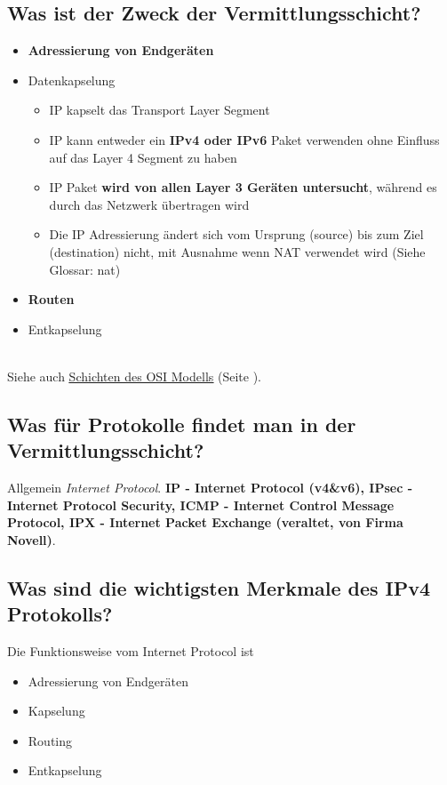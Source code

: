 \subsection*{Was ist der Zweck der Vermittlungsschicht?}
\begin{itemize}
    \item \textbf{Adressierung von Endgeräten }
    \item Datenkapselung
    \begin{itemize}
        \item IP kapselt das Transport Layer Segment
        \item IP kann entweder ein \textbf{IPv4 oder IPv6} Paket verwenden ohne Einfluss auf das Layer 4 Segment zu haben
        \item IP Paket \textbf{wird von allen Layer 3 Geräten untersucht}, während es durch das Netzwerk übertragen wird
        \item Die IP Adressierung ändert sich vom Ursprung (source) bis zum Ziel (destination) nicht, mit Ausnahme wenn NAT verwendet wird (Siehe Glossar: \gls{nat})
    \end{itemize}
    \item \textbf{Routen}
    \item Entkapselung
\end{itemize}\,\\
Siehe auch \underline{\hyperref[sub:SchichtenOSIModell]{Schichten des OSI Modells}} (Seite \pageref{sub:SchichtenOSIModell}).

\subsection*{Was für Protokolle findet man in der Vermittlungsschicht?}
Allgemein \textsl{Internet Protocol}. \textbf{IP - Internet Protocol (v4\&v6), IPsec - Internet Protocol Security, ICMP - Internet Control Message Protocol, IPX - Internet Packet Exchange (veraltet, von Firma Novell)}.

\pagebreak
\subsection*{Was sind die wichtigsten Merkmale des IPv4 Protokolls?}
Die Funktionsweise vom Internet Protocol ist
\begin{itemize}
    \item Adressierung von Endgeräten
    \item Kapselung
    \item Routing
    \item Entkapselung
\end{itemize}

